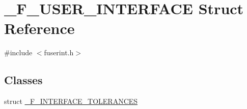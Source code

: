 \hypertarget{struct___f___u_s_e_r___i_n_t_e_r_f_a_c_e}{}\section{\+\_\+\+F\+\_\+\+U\+S\+E\+R\+\_\+\+I\+N\+T\+E\+R\+F\+A\+CE Struct Reference}
\label{struct___f___u_s_e_r___i_n_t_e_r_f_a_c_e}


{\ttfamily \#include $<$fuserint.\+h$>$}

\subsection*{Classes}
\begin{DoxyCompactItemize}
\item 
struct \hyperlink{struct___f___u_s_e_r___i_n_t_e_r_f_a_c_e_d6/dff/struct___f___u_s_e_r___i_n_t_e_r_f_a_c_e_1_1___f___i_n_t_e_r_f_a_c_e___t_o_l_e_r_a_n_c_e_s}{\+\_\+\+F\+\_\+\+I\+N\+T\+E\+R\+F\+A\+C\+E\+\_\+\+T\+O\+L\+E\+R\+A\+N\+C\+ES}
\end{DoxyCompactItemize}
